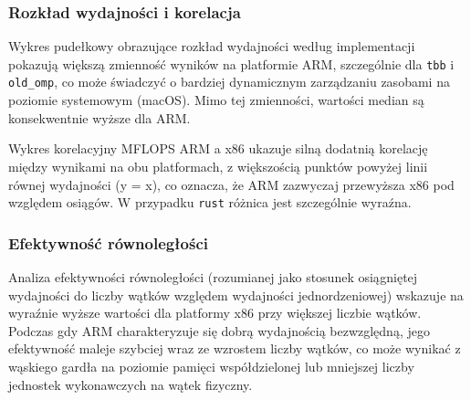 \subsubsection{Rozkład wydajności i korelacja}
Wykres pudełkowy obrazujące rozkład wydajności według implementacji pokazują większą zmienność wyników na platformie ARM, szczególnie dla \texttt{tbb} i \texttt{old\_omp}, co może świadczyć o bardziej dynamicznym zarządzaniu zasobami na poziomie systemowym (macOS). Mimo tej zmienności, wartości median są konsekwentnie wyższe dla ARM.

Wykres korelacyjny MFLOPS ARM a x86 ukazuje silną dodatnią korelację między wynikami na obu platformach, z większością punktów powyżej linii równej wydajności (y = x), co oznacza, że ARM zazwyczaj przewyższa x86 pod względem osiągów. W przypadku \texttt{rust} różnica jest szczególnie wyraźna.

\subsubsection{Efektywność równoległości}
Analiza efektywności równoległości (rozumianej jako stosunek osiągniętej wydajności do liczby wątków względem wydajności jednordzeniowej) wskazuje na wyraźnie wyższe wartości dla platformy x86 przy większej liczbie wątków. Podczas gdy ARM charakteryzuje się dobrą wydajnością bezwzględną, jego efektywność maleje szybciej wraz ze wzrostem liczby wątków, co może wynikać z wąskiego gardła na poziomie pamięci współdzielonej lub mniejszej liczby jednostek wykonawczych na wątek fizyczny.

